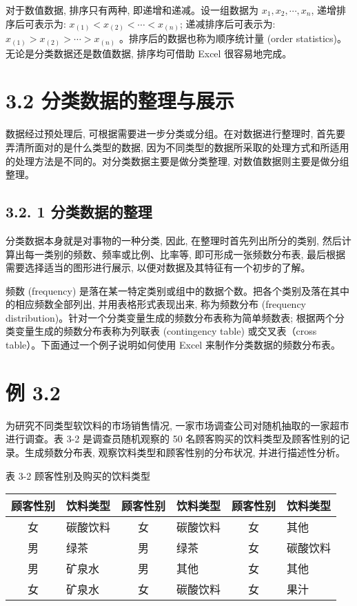 \documentclass[10pt]{article}
\begin{document}
\begin{CJK*}{UTF8}{bsmi}
对于数值数据, 排序只有两种, 即递增和递减。设一组数据为 $x_{1}, x_{2}, \cdots, x_{n}$, 递增排序后可表示为: $x_{(1)}<x_{(2)}<\cdots<x_{(n)}$; 递减排序后可表示为: $x_{(1)}>x_{(2)}>\cdots>x_{(n)}$ 。排序后的数据也称为顺序统计量 (order statistics)。无论是分类数据还是数值数据, 排序均可借助 Excel 很容易地完成。

\section*{3.2 分类数据的整理与展示}
数据经过预处理后, 可根据需要进一步分类或分组。在对数据进行整理时, 首先要弄清所面对的是什么类型的数据, 因为不同类型的数据所采取的处理方式和所适用的处理方法是不同的。对分类数据主要是做分类整理, 对数值数据则主要是做分组整理。

\subsection*{3.2. 1 分类数据的整理}
分类数据本身就是对事物的一种分类, 因此, 在整理时首先列出所分的类别, 然后计算出每一类别的频数、频率或比例、比率等, 即可形成一张频数分布表, 最后根据需要选择适当的图形进行展示, 以便对数据及其特征有一个初步的了解。

频数 (frequency) 是落在某一特定类别或组中的数据个数。把各个类别及落在其中的相应频数全部列出, 并用表格形式表现出来, 称为频数分布 (frequency distribution)。针对一个分类变量生成的频数分布表称为简单频数表; 根据两个分类变量生成的频数分布表称为列联表 (contingency table) 或交叉表（cross table）。下面通过一个例子说明如何使用 Excel 来制作分类数据的频数分布表。

\section*{例 3.2}
为研究不同类型软饮料的市场销售情况, 一家市场调查公司对随机抽取的一家超市进行调查。表 3-2 是调查员随机观察的 50 名顾客购买的饮料类型及顾客性别的记录。生成频数分布表, 观察饮料类型和顾客性别的分布状况, 并进行描述性分析。

表 3-2 顾客性别及购买的饮料类型

\begin{center}
\begin{tabular}{cl||cl||cl}
\hline
顾客性别 & \multicolumn{1}{|c||}{饮料类型} & 顾客性别 & \multicolumn{1}{c||}{饮料类型} & 顾客性别 & \multicolumn{1}{c}{饮料类型} \\
\hline
女 & 碳酸饮料 & 女 & 碳酸饮料 & 女 & 其他 \\
男 & 绿茶 & 男 & 绿茶 & 女 & 碳酸饮料 \\
男 & 矿泉水 & 男 & 其他 & 女 & 其他 \\
女 & 矿泉水 & 女 & 碳酸饮料 & 女 & 果汁 \\
\hline
\end{tabular}
\end{center}


\end{CJK*}
\end{document}
